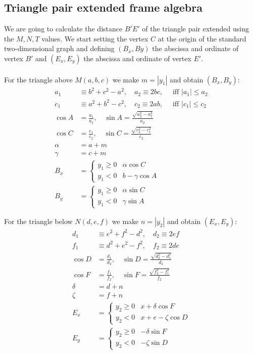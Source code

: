 \documentclass[11pt]{article}
\begin{document}
\subsection{Triangle pair extended frame algebra}

We are going to calculate the distance $\overline{B'E'}$ of the triangle pair extended using the $M,N,T$ values. We start setting the vertex $C$ at the origin of the standard two-dimensional graph and defining $(B_x, By)$ the abscissa and ordinate of vertex $B'$ and
$(E_x, E_y)$ the abscissa and ordinate of vertex $E'$.
\\\\
For the triangle above $M(a,b,c)$ we make $m = |y_1|$ and obtain $(B_x, B_y)$:
\begin{align}
a_1 &\equiv b^2 + c^2 - a^2, \quad a_2 \equiv 2bc, \quad \mbox{ iff } |a_1| \leq a_2\\
c_1 &\equiv a^2 + b^2 - c^2, \quad c_2 \equiv 2ab, \quad \mbox{ iff } |c_1| \leq c_2\\
\cos{A} &= \frac{a_1}{a_2}, \quad\sin{A} = \frac{\sqrt{a_2^2 - a_1^2}}{a_2}\\
\cos{C} &= \frac{c_1}{c_2}, \quad\sin{C} = \frac{\sqrt{c_2^2 - c_1^2}}{c_2}\\
\alpha &= a + m\\
\gamma &= c + m\\
B_x &= \left \{ \begin{array}{rl}
  y_1 \geq 0 & \alpha\cos{C}\\
  y_1 < 0    & b - \gamma\cos{A}
 \end{array}\right. \\
B_y &= \left \{ \begin{array}{rl}
 y_1 \geq 0 & \alpha\sin{C}\\
 y_1 < 0    & \gamma\sin{A}
 \end{array}\right.
\end{align}

For the triangle below $N(d,e,f)$ we make $n = |y_2|$ and obtain $(E_x,E_y)$:
\begin{align}
d_1 &\equiv e^2 + f^2 - d^2, \quad d_2 \equiv 2ef\\
f_1 &\equiv d^2 + e^2 - f^2, \quad f_2 \equiv 2de\\ 
\cos{D} &= \frac{d_1}{d_2}, \quad\sin{D} = \frac{\sqrt{d_2^2 - d_1^2}}{d_2}\\
\cos{F} &= \frac{f_1}{f_2}, \quad\sin{F} = \frac{\sqrt{f_2^2 - f_1^2}}{f_2}\\
\delta &= d + n\\
\zeta  &= f + n\\
E_x &= \left \{ \begin{array}{rl}
 y_2 \geq 0 & x + \delta\cos{F}\\
 y_2 < 0    & x + e - \zeta\cos{D} 
 \end{array}\right. \\
E_y &= \left \{ \begin{array}{rl}
 y_2 \geq 0 & -\delta\sin{F} \\
 y_2 < 0    & -\zeta\sin{D}
 \end{array}\right.
\end{align}
\end{document}
